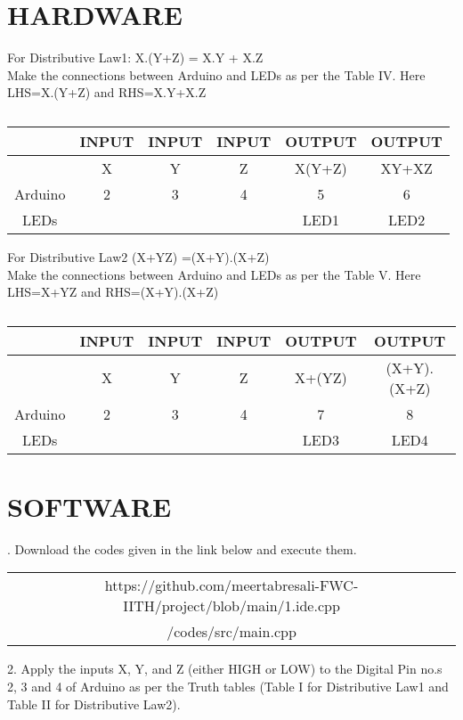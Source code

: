 \documentclass[conference]{IEEEtran}
\begin{document}
\section{HARDWARE}
\begin{flushleft}
For Distributive Law1: X.(Y+Z) = X.Y + X.Z \\
Make the connections between Arduino and LEDs as per the Table IV. Here LHS=X.(Y+Z) and RHS=X.Y+X.Z\\

\begin{table}[h]
\begin{tabular}{|c | c | c | c | c | c |} \hline
 & \textbf{INPUT} & \textbf{INPUT} & \textbf{INPUT} & \textbf{OUTPUT} & \textbf{OUTPUT} \\\hline
 & X & Y & Z & X(Y+Z) & XY+XZ \\ \hline
Arduino & 2 & 3 & 4 & 5 & 6 \\ \hline
LEDs &  &  &  & LED1 & LED2 \\ \hline
\end{tabular}
\caption{\label{tab:widgets}}
\end{table}
\end{flushleft}
\begin{flushleft}
For Distributive Law2 (X+YZ) =(X+Y).(X+Z) \\
Make the connections between Arduino and LEDs as per the Table V. Here LHS=X+YZ and RHS=(X+Y).(X+Z) \\
\end{flushleft}
\begin{table}[h]
\begin{tabular}{|c | c | c | c | c | c |} \hline
 & \textbf{INPUT} & \textbf{INPUT} & \textbf{INPUT} & \textbf{OUTPUT} & \textbf{OUTPUT} \\\hline
 & X & Y & Z & X+(YZ) & (X+Y).(X+Z) \\ \hline
Arduino & 2 & 3 & 4 & 7 & 8 \\ \hline
LEDs &  &  &  & LED3 & LED4 \\ \hline
\end{tabular}
\caption{\label{tab:widgets}}
\end{table}

\section{SOFTWARE}
. Download the codes given in the link below and execute them.\\

\begin{table}[h]
\centering
\begin{tabular}{| c |} \hline
 \rule{0pt}{20pt} https://github.com/meertabresali-FWC-IITH/project/blob/main/1.ide.cpp \\
 /codes/src/main.cpp \\\hline
\end{tabular}
\end{table}
\begin{flushleft}
2. Apply the inputs X, Y, and Z (either HIGH or LOW) to the Digital Pin no.s 2, 3 and 4 of Arduino as per the Truth tables (Table I for Distributive Law1 and Table II for Distributive Law2).
\end{flushleft}
\end{document}
